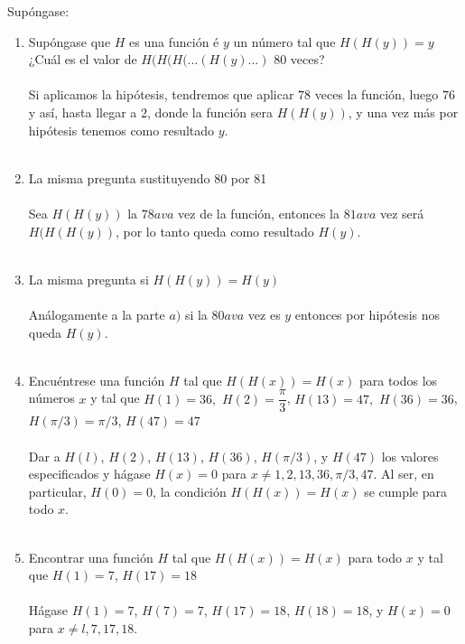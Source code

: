 \begin{ej}
\begin{enumerate}[\bfseries a)]
\begin{ej} Supóngase:
\begin{enumerate}[\bfseries a)]
\item Supóngase que $H$ es una función é \; $y$ \; un número tal que $H(H(y)) = y$ ¿Cuál es el valor de $H(H(H(...(H(y)...)$ $80$ veces?\\\\
Si aplicamos la hipótesis, tendremos que aplicar $78$ veces la función, luego $76$ y así, hasta llegar a $2$, donde la función sera $H(H(y))$, y una vez más por hipótesis tenemos como resultado $y$.\\\\
\item  La misma pregunta sustituyendo 80 por 81\\\\
Sea $H(H(y))$ la $78ava$ vez de la función, entonces la $81ava$ vez será $H(H(H(y))$, por lo tanto queda como resultado $H(y)$.\\\\ 

\item La misma pregunta si $H(H(y))=H(y)$\\\\
Análogamente a la parte $a)$ si la $80ava$ vez es $y$ entonces por hipótesis nos queda $H(y)$.\\\\ 

\item Encuéntrese una función $H$ tal que $H(H(x))=H(x)$ para todos los números $x$ \; y tal que $H(1)=36,$ $H(2)=\dfrac{\pi}{3}$, $H(13)=47,$ $H(36)=36$, $H(\pi / 3)=\pi / 3$, $H(47)=47$\\\\
Dar a $H(l)$, $H(2)$, $H(13)$, $H(36)$, $H(\pi /3)$, y $H(47)$ los valores especificados y hágase $H(x) = 0$ para $x \neq 1, 2, 13, 36, \pi /3, 47.$ Al ser, en particular, $H(0) = 0$, la condición $H(H(x)) = H(x)$ se cumple para todo $x$.\\\\

\item Encontrar una función $H$ tal que $H(H(x))=H(x)$ para todo $x$ \; y tal que $H(1)=7$, $H(17)=18$\\\\
Hágase $H(1) = 7$, $H(7) = 7$, $H(17) = 18$, $H(18) = 18$, y $H(x) = 0$ para $x \neq l , 7, 17, 18$.\\\\
\end{enumerate}
\end{ej}
\end{enumerate}
\end{ej}


